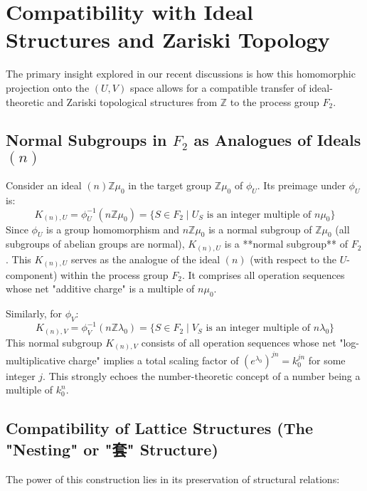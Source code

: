 \documentclass{article}[a4paper,12pt]
\begin{document}
\section{Compatibility with Ideal Structures and Zariski Topology}
\label{sec:compatibility}

The primary insight explored in our recent discussions is how this homomorphic projection onto the $(U,V)$ space allows for a compatible transfer of ideal-theoretic and Zariski topological structures from $\mathbb{Z}$ to the process group $F_2$.

\subsection{Normal Subgroups in $F_2$ as Analogues of Ideals $(n)$}
Consider an ideal $(n)\mathbb{Z}\mu_0$ in the target group $\mathbb{Z}\mu_0$ of $\phi_U$. Its preimage under $\phi_U$ is:
\[ K_{(n),U} = \phi_U^{-1}(n\mathbb{Z}\mu_0) = \{ S \in F_2 \mid U_S \text{ is an integer multiple of } n\mu_0 \} \]
Since $\phi_U$ is a group homomorphism and $n\mathbb{Z}\mu_0$ is a normal subgroup of $\mathbb{Z}\mu_0$ (all subgroups of abelian groups are normal), $K_{(n),U}$ is a **normal subgroup** of $F_2$. This $K_{(n),U}$ serves as the analogue of the ideal $(n)$ (with respect to the $U$-component) within the process group $F_2$. It comprises all operation sequences whose net "additive charge" is a multiple of $n\mu_0$.

Similarly, for $\phi_V$:
\[ K_{(n),V} = \phi_V^{-1}(n\mathbb{Z}\lambda_0) = \{ S \in F_2 \mid V_S \text{ is an integer multiple of } n\lambda_0 \} \]
This normal subgroup $K_{(n),V}$ consists of all operation sequences whose net "log-multiplicative charge" implies a total scaling factor of $(e^{\lambda_0})^{jn} = k_0^{jn}$ for some integer $j$. This strongly echoes the number-theoretic concept of a number being a multiple of $k_0^n$.

\subsection{Compatibility of Lattice Structures (The "Nesting" or "套" Structure)}
The power of this construction lies in its preservation of structural relations:
\end{document}
